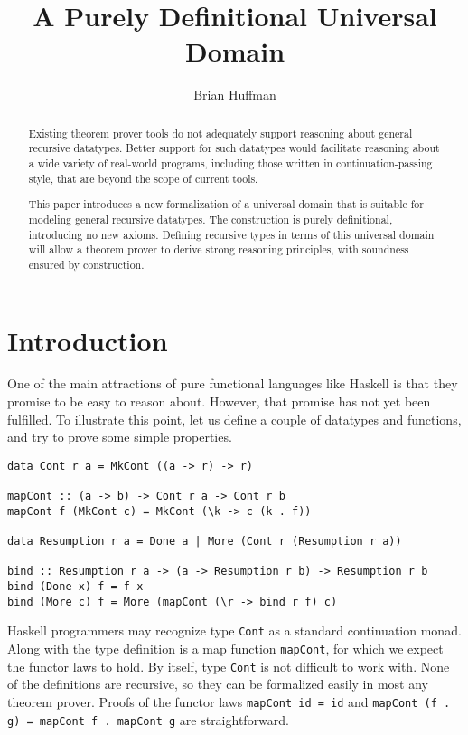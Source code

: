 \documentclass{llncs}
\begin{document}
\title{A Purely Definitional Universal Domain}

\author{Brian Huffman}


\maketitle

\begin{abstract}
Existing theorem prover tools do not adequately support reasoning
about general recursive datatypes.  Better support for such datatypes
would facilitate reasoning about a wide variety of real-world
programs, including those written in continuation-passing style, that
are beyond the scope of current tools.

This paper introduces a new formalization of a universal domain that
is suitable for modeling general recursive datatypes.  The
construction is purely definitional, introducing no new axioms.
Defining recursive types in terms of this universal domain will allow
a theorem prover to derive strong reasoning principles, with soundness
ensured by construction.
\end{abstract}

\section{Introduction}

One of the main attractions of pure functional languages like Haskell
is that they promise to be easy to reason about.  However, that
promise has not yet been fulfilled.  To illustrate this point, let us
define a couple of datatypes and functions, and try to prove some
simple properties.
\begin{verbatim}
data Cont r a = MkCont ((a -> r) -> r)

mapCont :: (a -> b) -> Cont r a -> Cont r b
mapCont f (MkCont c) = MkCont (\k -> c (k . f))

data Resumption r a = Done a | More (Cont r (Resumption r a))

bind :: Resumption r a -> (a -> Resumption r b) -> Resumption r b
bind (Done x) f = f x
bind (More c) f = More (mapCont (\r -> bind r f) c)
\end{verbatim}

Haskell programmers may recognize type \texttt{Cont} as a standard
continuation monad.  Along with the type definition is a map function
\texttt{mapCont}, for which we expect the functor laws to hold.  By
itself, type \texttt{Cont} is not difficult to work with.  None of the
definitions are recursive, so they can be formalized easily in most
any theorem prover.  Proofs of the functor laws \texttt{mapCont id =
  id} and \texttt{mapCont (f . g) = mapCont f . mapCont g} are
straightforward.
\end{document}
